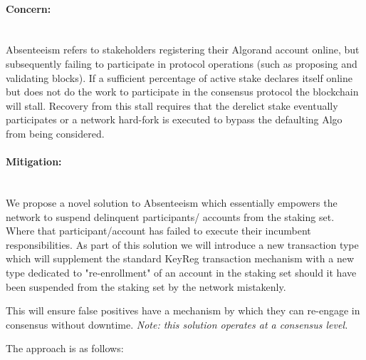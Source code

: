 \documentclass[11pt,a4paper]{article}
\begin{document}
\paragraph{Concern:} \mbox{}\\
Absenteeism refers to stakeholders registering their Algorand account online, but 
subsequently failing to participate in protocol operations (such as proposing and validating blocks). If a sufficient 
percentage of active stake declares itself online but does not do the work to participate in the consensus protocol the 
blockchain will stall. Recovery from this stall requires that the derelict stake eventually participates or a network 
hard-fork is executed to bypass the defaulting Algo from being considered. 

\paragraph{Mitigation:} \mbox{}\\
We propose a novel solution to Absenteeism which essentially empowers the network to suspend delinquent participants/
accounts from the staking set. Where that participant/account has failed to execute their incumbent responsibilities.
As part of this solution we will introduce a new transaction type which will supplement the standard \gls{KeyReg} 
transaction mechanism with a new type dedicated to "re-enrollment" of an account in the staking set should it have been 
suspended from the staking set by the network mistakenly.

This will ensure false positives have a mechanism by which they can re-engage in consensus without downtime.
\emph{Note: this solution operates at a consensus level.}

The approach is as follows:
\end{document}
